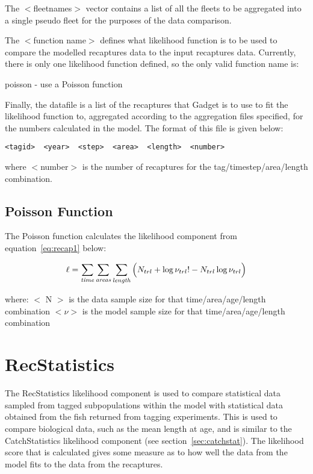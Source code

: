 \documentclass [a4paper, 10pt]{book}
\begin{document}
The $<$fleetnames$>$ vector contains a list of all the fleets to be aggregated into a single pseudo fleet for the purposes of the data comparison.

\bigskip
The $<$function name$>$ defines what likelihood function is to be used to compare the modelled recaptures data to the input recaptures data.  Currently, there is only one likelihood function defined, so the only valid function name is:

\bigskip
poisson - use a Poisson function

\bigskip
Finally, the datafile is a list of the recaptures that Gadget is to use to fit the likelihood function to, aggregated according to the aggregation files specified, for the numbers calculated in the model. The format of this file is given below:

{\small\begin{verbatim}
<tagid>  <year>  <step>  <area>  <length>  <number>
\end{verbatim}}

where $<$number$>$ is the number of recaptures for the tag/timestep/area/length combination.

\subsection{Poisson Function}
The Poisson function calculates the likelihood component from equation~\ref{eq:recap1} below:

\begin{equation}\label{eq:recap1}
\ell = \sum_{\it time}\sum_{\it areas}\sum_{\it length} \Big( N_{trl} + \log \nu_{trl}! - N_{trl} \log \nu_{trl} \Big)
\end{equation}

where:\newline
$<$ N $>$ is the data sample size for that time/area/age/length combination\newline
$<\nu>$ is the model sample size for that time/area/age/length combination

\section{RecStatistics}\label{sec:recstat}
The RecStatistics likelihood component is used to compare statistical data sampled from tagged subpopulations within the model with statistical data obtained from the fish returned from tagging experiments.  This is used to compare biological data, such as the mean length at age, and is similar to the CatchStatistics likelihood component (see section~\ref{sec:catchstat}).  The likelihood score that is calculated gives some measure as to how well the data from the model fits to the data from the recaptures.
\end{document}
